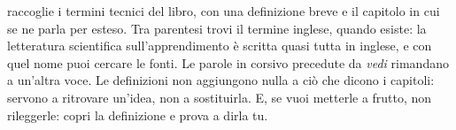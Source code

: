 \newcommand{\glinglese}[1]{\if\relax\detokenize{#1}\relax\else\ (\emph{#1})\fi}
\newcommand{\glsep}{\hskip 0.5em plus 0.25em minus 0.1em\relax}
\newcommand{\voce}[4]{%
  \par\vspace{0.4\baselineskip plus 0.15\baselineskip}%
  \begingroup\setlength{\emergencystretch}{1.5em}%
  \noindent\hangindent=1.2em\hangafter=1
  \textbf{#1}\glinglese{#2}.\glsep #3\glsep
  {\footnotesize\itshape #4.}\par\endgroup}
\newcommand{\rinvio}[2]{%
  \par\vspace{0.4\baselineskip plus 0.15\baselineskip}%
  \begingroup\setlength{\emergencystretch}{1.5em}%
  \noindent\hangindent=1.2em\hangafter=1
  \textbf{#1}:\glsep\emph{vedi} #2.\par\endgroup}
\newcommand{\lettera}[1]{%
  \par\vspace{1.1\baselineskip plus 0.4\baselineskip}%
  {\centering\color{rubrica}\scshape\spaziato[150]{\MakeLowercase{#1}}\par}%
  \nopagebreak\vspace{0.2\baselineskip}\nopagebreak}
\raggedbottom

 raccoglie i termini tecnici del libro,
con una definizione breve e il capitolo in cui se ne parla per esteso.
Tra parentesi trovi il termine inglese, quando esiste: la letteratura
scientifica sull'apprendimento è scritta quasi tutta in inglese, e con
quel nome puoi cercare le fonti. Le parole in corsivo precedute da
\emph{vedi} rimandano a un'altra voce. Le definizioni non aggiungono
nulla a ciò che dicono i capitoli: servono a ritrovare un'idea, non a
sostituirla. E, se vuoi metterle a frutto, non rileggerle: copri la
definizione e prova a dirla tu.

\small

